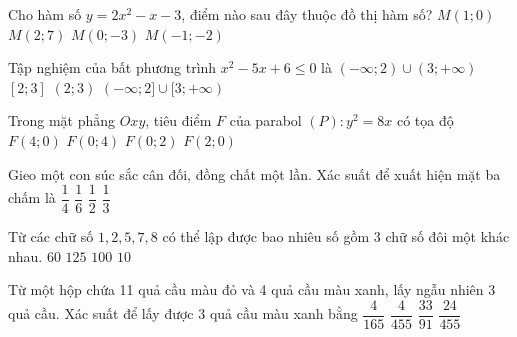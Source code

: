 \begin{ex}%
Cho hàm số $y=2 x^2-x-3$, điểm nào sau đây thuộc đồ thị hàm số?
\choice
{$M(1 ; 0)$}
{$M(2 ; 7)$}
{\True $M(0 ;-3)$}
{$M(-1 ;-2)$}
\end{ex}
\begin{ex}%
Tập nghiệm của bất phương trình $x^2-5 x+6 \leq 0$ là
\choice
{$(-\infty ; 2) \cup(3 ;+\infty)$}
{\True $[2 ; 3]$}
{$(2 ; 3)$}
{$(-\infty ; 2] \cup[3 ;+\infty)$}
\end{ex}
\begin{ex}%
Trong mặt phẳng $Oxy$, tiêu điểm $F$ của parabol $(P)\colon y^2=8 x$ có tọa độ
\choice
{$F(4 ; 0)$}
{$F(0 ; 4)$}
{$F(0 ; 2)$}
{\True $F(2;0)$}
\end{ex}
\begin{ex}%
Gieo một con súc sắc cân đối, đồng chất một lần. Xác suất để xuất hiện mặt ba chấm là
\choice
{$\dfrac{1}{4}$}
{\True $\dfrac{1}{6}$}
{$\dfrac{1}{2}$}
{$\dfrac{1}{3}$}
\end{ex}
\begin{ex}%
Từ các chữ số $1,2,5,7,8$ có thể lập được bao nhiêu số gồm 3 chữ số đôi một khác nhau.
\choice
{\True $60$}
{$125$}
{$100$}
{$10$}
\end{ex}
\begin{ex}%
Từ một hộp chứa 11 quả cầu màu đỏ và 4 quả cầu màu xanh, lấy ngẫu nhiên 3 quả cầu. Xác suất để lấy được 3 quả cầu màu xanh bằng
\choice
{$\dfrac{4}{165}$}
{\True $\dfrac{4}{455}$}
{$\dfrac{33}{91}$}
{$\dfrac{24}{455}$}
\end{ex}
